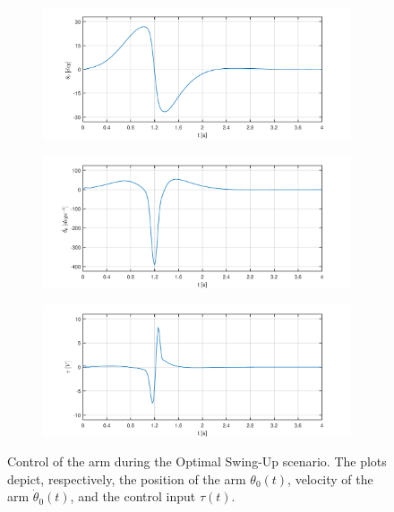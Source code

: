 \begin{figure}[H]
	\centering
	\begin{subfigure}
		\centering
		\includegraphics[scale=0.6]{images/Oswing/arm.pdf}  
	\end{subfigure}
	\begin{subfigure}
		\centering
		\includegraphics[scale=0.6]{images/Oswing/darm.pdf}  
	\end{subfigure}
	\begin{subfigure}
		\centering
		\includegraphics[scale=0.6]{images/Oswing/control.pdf}  
	\end{subfigure}
	\caption{Control of the arm during the Optimal Swing-Up scenario. The plots depict, respectively, the position of the arm $\theta_0(t)$, velocity of the arm $\dot{\theta}_0(t)$, and the control input $\tau(t)$.}
	\label{NMPC:results}
\end{figure}
